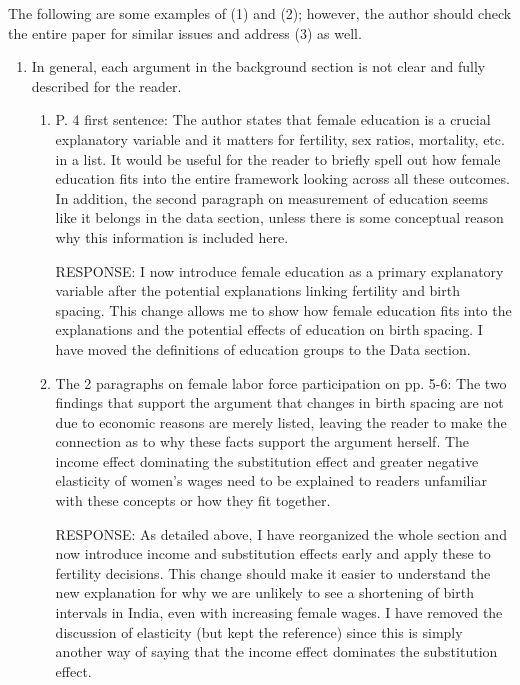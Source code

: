 \documentclass[letterpaper,12pt]{article}
\begin{document}
\noindent The following are some examples of (1) and (2); however, the author should check the entire
paper for similar issues and address (3) as well.

\begin{enumerate}


\item  In general, each argument in the background section is not clear and fully described for
the reader.

\begin{enumerate}


\item  P. 4 first sentence: The author states that female education is a crucial explanatory
variable and it matters for fertility, sex ratios, mortality, etc. in a list. It would be
useful for the reader to briefly spell out how female education fits into the entire
framework looking across all these outcomes. In addition, the second paragraph on
measurement of education seems like it belongs in the data section, unless there is some
conceptual reason why this information is included here.

RESPONSE: I now introduce female education as a primary explanatory variable after the 
potential explanations linking fertility and birth spacing.
This change allows me to show how female education fits into the explanations and 
the potential effects of education on birth spacing.
I have moved the definitions of education groups to the Data section.

\item  The 2 paragraphs on female labor force participation on pp. 5-6: The two findings that
support the argument that changes in birth spacing are not due to economic reasons are
merely listed, leaving the reader to make the connection as to why these facts support the
argument herself. The income effect dominating the substitution effect and greater negative
elasticity of women’s wages need to be explained to readers unfamiliar with these concepts
or how they fit together.

RESPONSE: As detailed above, I have reorganized the whole section and now introduce income
and substitution effects early and apply these to fertility decisions.
This change should make it easier to understand the new explanation for why we are unlikely
to see a shortening of birth intervals in India, even with increasing female wages.
I have removed the discussion of elasticity (but kept the reference) since this is simply
another way of saying that the income effect dominates the substitution effect.


\end{enumerate}
\end{enumerate}
\end{document}
